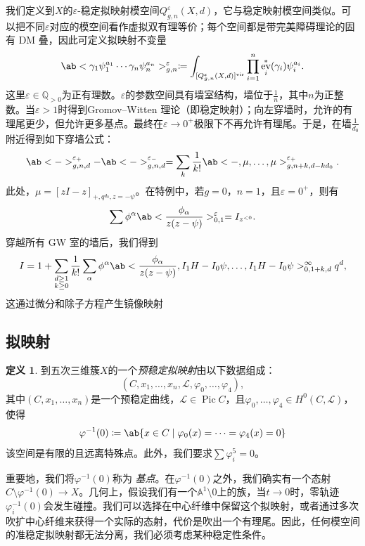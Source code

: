 \documentclass{amsart}
\theoremstyle{definition}
\newtheorem{defn}[thm]{定义}
\theoremstyle{remark}
\theoremstyle{plain}
\theoremstyle{definition}
\theoremstyle{remark}
\newcommand{\A}{\mathbb{A}}
\newcommand{\Q}{\mathbb{Q}}
\newcommand{\ep}{\varepsilon}
\newcommand{\mc}[1]{\mathcal{#1}}
\newcommand{\mr}[1]{\mathrm{#1}}
\newcommand{\1}{\mathbf{1}}
\newcommand{\2}{\mathbf{2}}
\newcommand{\3}{\mathbf{3}}
\newcommand{\vir}{\mr{vir}}
\DeclareMathOperator{\Pic}{Pic}
\DeclareMathOperator{\ev}{ev}
\begin{document}
我们定义到\(X\)的\(\ep\)-稳定拟映射模空间\(Q_{g,n}^{\ep}(X, d)\)，它与稳定映射模空间类似。可以把不同\(\ep\)对应的模空间看作虚拟双有理等价；每个空间都是带完美障碍理论的固有 DM 叠，因此可定义拟映射不变量
\[ \ab< \gamma_1 \psi_1^{a_1} \cdots \gamma_n \psi_n^{a_n}>_{g,n}^{\ep} \coloneqq \int_{[Q_{g,n}^{\ep}(X,d)]^{\vir}} \prod_{i=1}^n \ev_i^*(\gamma_i) \psi_i^{a_i}. \]
这里\(\ep \in \Q_{>0}\)为正有理数。\(\ep\)的参数空间具有墙室结构，墙位于\(\frac{1}{n}\)，其中\(n\)为正整数。当\(\ep > 1\)时得到Gromov--Witten 理论（即稳定映射）；向左穿墙时，允许的有理尾更少，但允许更多基点。最终在\(\ep \to 0^+\)极限下不再允许有理尾。于是，在墙\(\frac{1}{d_0}\)附近得到如下穿墙公式：
\[ \ab<->_{g,n,d}^{\ep_+} - \ab<->_{g,n,d}^{\ep_-} = \sum_{k} \frac{1}{k!} \ab<-, \mu, \ldots, \mu>_{g,n+k, d-kd_0}^{\ep_+}. \]
此处，\(\mu = [zI-z]_{+, q^{d_0}, z=-\psi}\)。在特例中，若\(g = 0\)，\(n = 1\)，且\(\ep = 0^+\)，则有
\[ \sum \phi^{\alpha} \ab<\frac{\phi_{\alpha}}{z(z-\psi)}>^{\ep}_{0,1} = I_{z^{<0}}. \]
穿越所有 GW 室的墙后，我们得到
\[ I = 1 + \sum_{\substack{d \geq 1 \\ k \geq 0}} \frac{1}{k!} \sum_{\alpha} \phi^{\alpha} \ab< \frac{\phi_{\alpha}}{z(z-\psi)}, I_1 H - I_0 \psi, \ldots, I_1 H - I_0 \psi>_{0,1+k,d}^{\infty} q^d, \]
这通过微分和除子方程产生镜像映射

\subsection{拟映射}%
\label{sub:Quasimaps}

\begin{defn}
    到五次三维簇\(X\)的一个\textit{预稳定拟映射}由以下数据组成：
    \[(C, x_1, \ldots, x_n, \mc{L}, \varphi_0, \ldots, \varphi_4),\] 
    其中\((C, x_1, \ldots, x_n)\)是一个预稳定曲线，\(\mc{L} \in \Pic C\)，且\(\varphi_0, \ldots, \varphi_4 \in H^0(C, \mc{L})\)，使得
    \[ \varphi^{-1}(0) \coloneqq \ab\{x \in C \mid \varphi_0(x) = \cdots = \varphi_4(x) = 0 \} \]
    该空间是有限的且远离特殊点。此外，我们要求\(\sum \varphi_i^5 = 0\)。
\end{defn}

重要地，我们将\(\varphi^{-1}(0)\)称为 \textit{基点}。在\(\varphi^{-1}(0)\)之外，我们确实有一个态射\(C \setminus \varphi^{-1}(0) \to X\)。几何上，假设我们有一个\(\A^1 \setminus 0\)上的族，当\(t \to 0\)时，零轨迹\(\varphi_i^{-1}(0)\)会发生碰撞。我们可以选择在中心纤维中保留这个拟映射，或者通过多次吹扩中心纤维来获得一个实际的态射，代价是吹出一个有理尾。因此，任何模空间的准稳定拟映射都无法分离，我们必须考虑某种稳定性条件。
\end{document}
